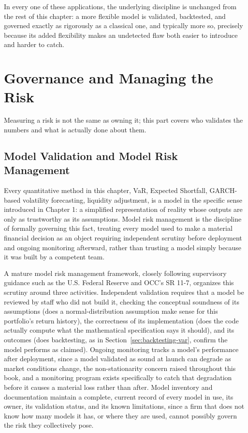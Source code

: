 \documentclass[../ai_in_finance]{subfiles}
\begin{document}
In every one of these applications, the underlying discipline is unchanged from the rest of this chapter: a more flexible model is validated, backtested, and governed exactly as rigorously as a classical one, and typically more so, precisely because its added flexibility makes an undetected flaw both easier to introduce and harder to catch.

\section{Governance and Managing the Risk}

Measuring a risk is not the same as owning it; this part covers who validates the numbers and what is actually done about them.

\subsection{Model Validation and Model Risk Management}

Every quantitative method in this chapter, VaR, Expected Shortfall, GARCH-based volatility forecasting, liquidity adjustment, is a model in the specific sense introduced in Chapter 1: a simplified representation of reality whose outputs are only as trustworthy as its assumptions. Model risk management is the discipline of formally governing this fact, treating every model used to make a material financial decision as an object requiring independent scrutiny before deployment and ongoing monitoring afterward, rather than trusting a model simply because it was built by a competent team.

A mature model risk management framework, closely following supervisory guidance such as the U.S. Federal Reserve and OCC's SR 11-7, organizes this scrutiny around three activities. Independent validation requires that a model be reviewed by staff who did not build it, checking the conceptual soundness of its assumptions (does a normal-distribution assumption make sense for this portfolio's return history), the correctness of its implementation (does the code actually compute what the mathematical specification says it should), and its outcomes (does backtesting, as in Section~\ref{sec:backtesting-var}, confirm the model performs as claimed).
Ongoing monitoring tracks a model's performance after deployment, since a model validated as sound at launch can degrade as market conditions change, the non-stationarity concern raised throughout this book, and a monitoring program exists specifically to catch that degradation before it causes a material loss rather than after.
Model inventory and documentation maintain a complete, current record of every model in use, its owner, its validation status, and its known limitations, since a firm that does not know how many models it has, or where they are used, cannot possibly govern the risk they collectively pose.
\end{document}
